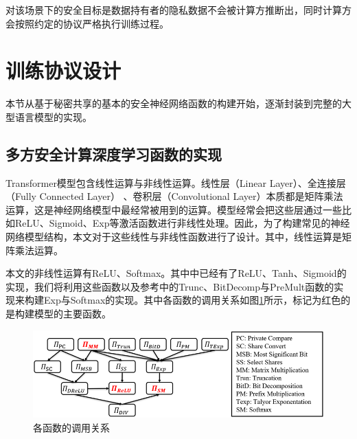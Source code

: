对该场景下的安全目标是数据持有者的隐私数据不会被计算方推断出，同时计算方会按照约定的协议严格执行训练过程。


\section{训练协议设计} \label{chap4_train_protocol}

本节从基于秘密共享的基本的安全神经网络函数的构建开始，逐渐封装到完整的大型语言模型的实现。

\subsection{多方安全计算深度学习函数的实现}



Transformer模型包含线性运算与非线性运算。线性层（Linear Layer）、全连接层（Fully Connected Layer） 、卷积层（Convolutional Layer）本质都是矩阵乘法运算，这是神经网络模型中最经常被用到的运算。模型经常会把这些层通过一些比如ReLU、Sigmoid、Exp等激活函数进行非线性处理。因此，为了构建常见的神经网络模型结构，本文对于这些线性与非线性函数进行了设计。其中，线性运算是矩阵乘法运算。

本文的非线性运算有ReLU、Softmax。其中\cite{SecureNN}\cite{S++}中已经有了ReLU、Tanh、Sigmoid的实现，我们将利用这些函数以及参考\cite{MPC_Fix_Point}中的Trunc、BitDecomp与PreMult函数的实现来构建Exp与Softmax的实现。其中各函数的调用关系如图\ref{Chap4_Func_All}所示，标记为红色的是构建模型的主要函数。

\begin{figure}[h]
	\centering
	\includegraphics[width=\linewidth]{figures/Chap4_Func_All.png}
	\caption{各函数的调用关系}
	\label{Chap4_Func_All}
\end{figure}

